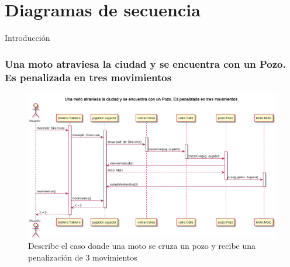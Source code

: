 \documentclass[titlepage,a4paper]{article}
\begin{document}


\section{Diagramas de secuencia}\label{sec:diagramasdesecuencia}

Introducción


\subsubsection[Una moto atraviesa la ciudad y se encuentra con un Pozo. Es penalizada en tres movimientos]{Una moto atraviesa la ciudad y se encuentra con un Pozo. Es penalizada en tres movimientos}

\begin{figure}[H]
  \centering
  \includegraphics[width=1\textwidth]{diagramas/SecuenciaUnaMotoCruzaUnPozoYEsPenalizado.png}
  \caption{\label{fig:class01}Describe el caso donde una moto se cruza un pozo y recibe una penalización de 3 movimientos}
\end{figure}
\end{document}
